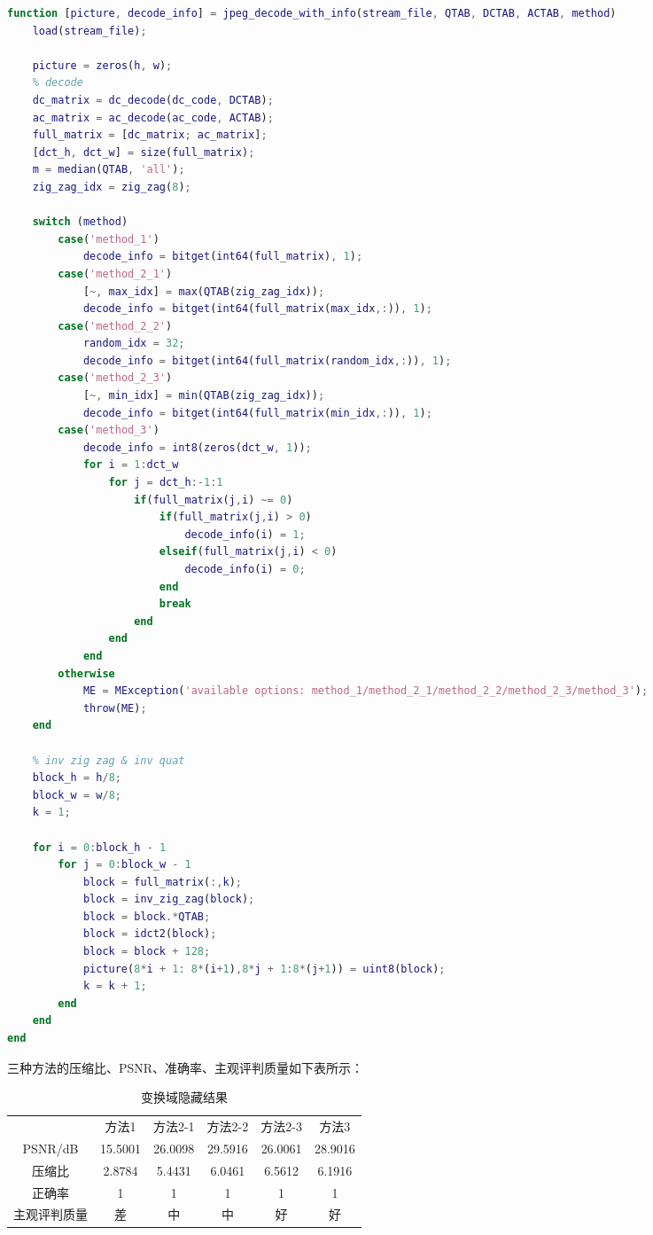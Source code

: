 \documentclass[a4paper]{article}
\begin{document}
\begin{lstlisting}[language=matlab, caption=信息解码]
function [picture, decode_info] = jpeg_decode_with_info(stream_file, QTAB, DCTAB, ACTAB, method)
    load(stream_file);
    
    picture = zeros(h, w);
    % decode
    dc_matrix = dc_decode(dc_code, DCTAB);
    ac_matrix = ac_decode(ac_code, ACTAB);
    full_matrix = [dc_matrix; ac_matrix];
    [dct_h, dct_w] = size(full_matrix);
    m = median(QTAB, 'all');
    zig_zag_idx = zig_zag(8);
    
    switch (method)
        case('method_1')
            decode_info = bitget(int64(full_matrix), 1);
        case('method_2_1')
            [~, max_idx] = max(QTAB(zig_zag_idx));
            decode_info = bitget(int64(full_matrix(max_idx,:)), 1);
        case('method_2_2')
            random_idx = 32;
            decode_info = bitget(int64(full_matrix(random_idx,:)), 1);
        case('method_2_3')
            [~, min_idx] = min(QTAB(zig_zag_idx));
            decode_info = bitget(int64(full_matrix(min_idx,:)), 1);
        case('method_3')
            decode_info = int8(zeros(dct_w, 1));
            for i = 1:dct_w
                for j = dct_h:-1:1
                    if(full_matrix(j,i) ~= 0)
                        if(full_matrix(j,i) > 0)
                            decode_info(i) = 1;
                        elseif(full_matrix(j,i) < 0)
                            decode_info(i) = 0;
                        end
                        break
                    end
                end
            end
        otherwise
            ME = MException('available options: method_1/method_2_1/method_2_2/method_2_3/method_3');
            throw(ME);
    end

    % inv zig zag & inv quat
    block_h = h/8;
    block_w = w/8;
    k = 1;

    for i = 0:block_h - 1
        for j = 0:block_w - 1
            block = full_matrix(:,k);
            block = inv_zig_zag(block);
            block = block.*QTAB;
            block = idct2(block);
            block = block + 128;
            picture(8*i + 1: 8*(i+1),8*j + 1:8*(j+1)) = uint8(block);
            k = k + 1;
        end
    end
end
\end{lstlisting}

\par 三种方法的压缩比、PSNR、准确率、主观评判质量如下表所示：

\begin{table}[htbp]
  \centering
  \caption{变换域隐藏结果}
    \begin{tabular}{cccccc}
          & 方法1   & 方法2-1 & 方法2-2 & 方法2-3 & 方法3 \\
    PSNR/dB & 15.5001 & 26.0098 & 29.5916 & 26.0061 & 28.9016 \\
    压缩比   & 2.8784 & 5.4431 & 6.0461 & 6.5612 & 6.1916 \\
    正确率   & 1     & 1     & 1     & 1     & 1 \\
    主观评判质量 & 差     & 中     & 中     & 好     & 好 \\
    \end{tabular}%
  \label{tab:addlabel}%
\end{table}%
\end{document}
